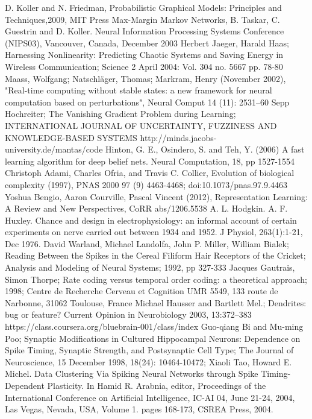 \documentclass[a4paper,10pt]{article}
\begin{document}
\begin{thebibliography}{9}
D. Koller and N. Friedman, Probabilistic Graphical Models: Principles and Techniques,2009, MIT Press
Max-Margin Markov Networks,  B. Taskar, C. Guestrin and D. Koller. Neural Information Processing Systems Conference (NIPS03), Vancouver, Canada, December 2003
Herbert Jaeger, Harald Haas; Harnessing Nonlinearity: Predicting Chaotic Systems and Saving Energy in Wireless Communication; 
Science 2 April 2004: Vol. 304 no. 5667 pp. 78-80 
Maass, Wolfgang; Natschläger, Thomas; Markram, Henry (November 2002), "Real-time computing without stable states: a new framework for neural computation based on perturbations", Neural Comput 14 (11): 2531–60
Sepp Hochreiter; The Vanishing Gradient Problem during Learning; INTERNATIONAL JOURNAL OF UNCERTAINTY, FUZZINESS AND KNOWLEDGE-BASED SYSTEMS
http://minds.jacobs-university.de/mantas/code
Hinton, G. E., Osindero, S. and Teh, Y. (2006)
A fast learning algorithm for deep belief nets.
Neural Computation, 18, pp 1527-1554
Christoph Adami, Charles Ofria, and Travis C. Collier, Evolution of biological complexity (1997), PNAS 2000 97 (9) 4463-4468; doi:10.1073/pnas.97.9.4463
Yoshua Bengio, Aaron Courville, Pascal Vincent (2012), Representation Learning: A Review and New Perspectives, CoRR abs/1206.5538 
A. L. Hodgkin. A. F. Huxley. Chance and design in electrophysiology: an informal account of certain experiments on nerve carried out between 1934 and 1952. J Physiol, 263(1):1-21, Dec 1976.
David Warland, Michael Landolfa, John P. Miller, William Bialek; Reading Between the Spikes in the Cereal Filiform Hair Receptors of the Cricket; Analysis and Modeling of Neural Systems; 1992, pp 327-333
Jacques Gautrais, Simon Thorpe; Rate coding versus temporal order coding: a theoretical approach; 1998; Centre de Recherche Cerveau et Cognition UMR 5549, 133 route de Narbonne, 31062 Toulouse, France
Michael Hausser and Bartlett Mel.; Dendrites: bug or feature? Current Opinion in Neurobiology 2003, 13:372–383
https://class.coursera.org/bluebrain-001/class/index
Guo-qiang Bi and Mu-ming Poo; Synaptic Modifications in Cultured Hippocampal Neurons: Dependence on Spike Timing, Synaptic Strength, and Postsynaptic Cell Type; The Journal of Neuroscience, 15 December 1998, 18(24): 10464-10472;
Xiaoli Tao, Howard E. Michel. Data Clustering Via Spiking Neural Networks through Spike Timing-Dependent Plasticity. In Hamid R. Arabnia, editor, Proceedings of the International Conference on Artificial Intelligence, IC-AI 04, June 21-24, 2004, Las Vegas, Nevada, USA, Volume 1. pages 168-173, CSREA Press, 2004.

\end{thebibliography}
\end{document}
